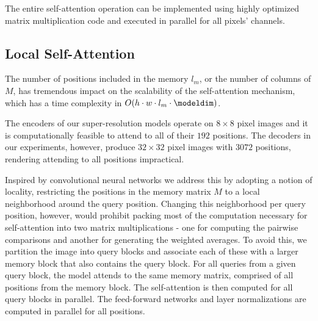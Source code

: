 The entire self-attention operation can be implemented using highly optimized matrix multiplication code and executed in parallel for all pixels' channels.




\subsection{Local Self-Attention}
\label{sec:local-self-attention}

The number of positions included in the memory $l_{m}$, or the number of columns of $M$, has tremendous impact on the scalability of the self-attention mechanism, which has a time complexity in $O(h \cdot w \cdot l_{m} \cdot \modeldim)$.

The encoders of our super-resolution models operate on $8\times8$ pixel images and it is computationally feasible to attend to all of their $192$ positions. The decoders in our experiments, however, produce $32\times32$ pixel images with $3072$ positions, rendering attending to all positions impractical.

Inspired by convolutional neural networks we address this by adopting a notion of locality, restricting the positions in the memory matrix $M$ to a local neighborhood around the query position. Changing this neighborhood per query position, however, would prohibit packing most of the computation necessary for self-attention into two matrix multiplications - one for computing the pairwise comparisons and another for generating the weighted averages. To avoid this, we partition the image into query blocks and associate each of these with a larger memory block that also contains the query block. For all queries from a given query block, the model attends to the same memory matrix, comprised of all positions from the memory block.
The self-attention is then computed for all query blocks in parallel.
The feed-forward networks and layer normalizations are computed in parallel for all positions.

